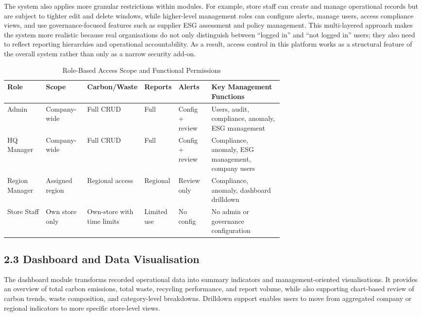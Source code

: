\documentclass[10pt,a4paper]{article}
\begin{document}
The system also applies more granular restrictions within modules. For example, store staff can create and manage operational records but are subject to tighter edit and delete windows, while higher-level management roles can configure alerts, manage users, access compliance views, and use governance-focused features such as supplier ESG assessment and policy management. This multi-layered approach makes the system more realistic because real organisations do not only distinguish between ``logged in'' and ``not logged in'' users; they also need to reflect reporting hierarchies and operational accountability. As a result, access control in this platform works as a structural feature of the overall system rather than only as a narrow security add-on.

\begin{table}[h]
\centering
\scriptsize
\begin{tabularx}{\linewidth}{@{}p{0.14\linewidth}p{0.15\linewidth}p{0.14\linewidth}p{0.11\linewidth}p{0.12\linewidth}X@{}}
\toprule
\textbf{Role} & \textbf{Scope} & \textbf{Carbon/Waste} & \textbf{Reports} & \textbf{Alerts} & \textbf{Key Management Functions} \\
\midrule
Admin & Company-wide & Full CRUD & Full & Config + review & Users, audit, compliance, anomaly, ESG management \\
HQ Manager & Company-wide & Full CRUD & Full & Config + review & Compliance, anomaly, ESG management, company users \\
Region Manager & Assigned region & Regional access & Regional & Review only & Compliance, anomaly, dashboard drilldown \\
Store Staff & Own store only & Own-store with time limits & Limited use & No config & No admin or governance configuration \\
\bottomrule
\end{tabularx}
\caption{Role-Based Access Scope and Functional Permissions}
\end{table}

\subsection*{2.3 Dashboard and Data Visualisation}
The dashboard module transforms recorded operational data into summary indicators and management-oriented visualisations. It provides an overview of total carbon emissions, total waste, recycling performance, and report volume, while also supporting chart-based review of carbon trends, waste composition, and category-level breakdowns. Drilldown support enables users to move from aggregated company or regional indicators to more specific store-level views.
\end{document}
